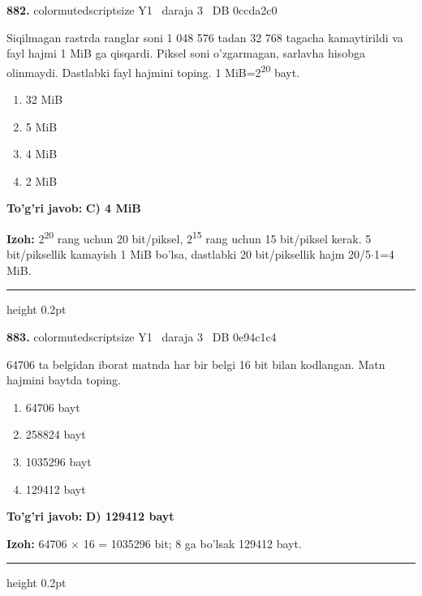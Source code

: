\documentclass[10pt,a4paper,oneside]{article}
\begin{document}
\noindent\textbf{\color{ink}882.}  {color{muted}scriptsize Y1 \textbullet\ daraja 3 \textbullet\ DB 0ccda2c0}
\par
Siqilmagan rastrda ranglar soni 1 048 576 tadan 32 768 tagacha kamaytirildi va fayl hajmi 1 MiB ga qisqardi. Piksel soni o'zgarmagan, sarlavha hisobga olinmaydi. Dastlabki fayl hajmini toping. 1 MiB=2\textsuperscript{2}\textsuperscript{0} bayt.
\begin{enumerate}[label=\Alph*),leftmargin=9mm]
\item 32 MiB
\item 5 MiB
\item 4 MiB
\item 2 MiB
\end{enumerate}
\begin{tcolorbox}[enhanced,breakable,colback=teal!4,colframe=teal!50!black,boxrule=0.5pt,arc=1.1mm,left=3mm,right=3mm,top=1.7mm,bottom=1.7mm,before skip=2mm,after skip=2mm]
\textbf{\color{teal}To'g'ri javob:} \textbf{C) 4 MiB}
\par\smallskip
\textbf{Izoh:} 2\textsuperscript{2}\textsuperscript{0} rang uchun 20 bit/piksel, 2\textsuperscript{1}\textsuperscript{5} rang uchun 15 bit/piksel kerak. 5 bit/piksellik kamayish 1 MiB bo'lsa, dastlabki 20 bit/piksellik hajm 20/5\ensuremath{\cdot}1=4 MiB.
\end{tcolorbox}
\vspace{2mm}\hrule height 0.2pt \vspace{3mm}

\noindent\textbf{\color{ink}883.}  {color{muted}scriptsize Y1 \textbullet\ daraja 3 \textbullet\ DB 0e94c1c4}
\par
64706 ta belgidan iborat matnda har bir belgi 16 bit bilan kodlangan. Matn hajmini baytda toping.
\begin{enumerate}[label=\Alph*),leftmargin=9mm]
\item 64706 bayt
\item 258824 bayt
\item 1035296 bayt
\item 129412 bayt
\end{enumerate}
\begin{tcolorbox}[enhanced,breakable,colback=teal!4,colframe=teal!50!black,boxrule=0.5pt,arc=1.1mm,left=3mm,right=3mm,top=1.7mm,bottom=1.7mm,before skip=2mm,after skip=2mm]
\textbf{\color{teal}To'g'ri javob:} \textbf{D) 129412 bayt}
\par\smallskip
\textbf{Izoh:} 64706 \ensuremath{\times} 16 = 1035296 bit; 8 ga bo'lsak 129412 bayt.
\end{tcolorbox}
\vspace{2mm}\hrule height 0.2pt \vspace{3mm}
\end{document}
